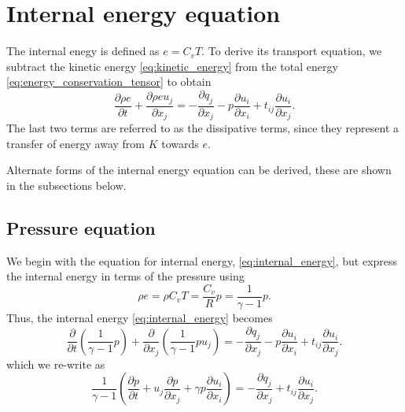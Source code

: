 \documentclass[oneside,a4paper,11pt]{report}
\begin{document}
\section{Internal energy equation}
\label{sec:alternate_forms_internal_energy_equation}
The internal enegy is defined as $e = C_v T$. To derive its transport equation, we subtract the kinetic energy \cref{eq:kinetic_energy} from the total energy \cref{eq:energy_conservation_tensor} to obtain
\begin{equation}
\label{eq:internal_energy}
\frac{ \partial \rho e}{\partial t} + \frac{\partial \rho e u_j}{\partial x_j} = -\frac{\partial q_j}{\partial x_j} - p \frac{\partial u_i}{\partial x_i} + t_{ij} \frac{\partial u_i}{\partial x_j}.
\end{equation}
The last two terms are referred to as the dissipative terms, since they represent a transfer of energy away from $K$ towards $e$.

Alternate forms of the internal energy equation can be derived, these are shown in the subsections below.
\subsection{Pressure equation} 
We begin with the equation for internal energy, \cref{eq:internal_energy}, but express the internal energy in terms of the pressure using 
\begin{equation}
\rho e = \rho C_v T = \frac{C_v}{R} p = \frac{1}{\gamma - 1} p.
\end{equation}
Thus, the internal energy \cref{eq:internal_energy} becomes
\begin{equation}
\frac{ \partial}{\partial t} \left ( \frac{1}{\gamma - 1} p \right ) + \frac{\partial}{\partial x_j} \left ( \frac{1}{\gamma - 1} p u_j \right ) = -\frac{\partial q_j}{\partial x_j} - p \frac{\partial u_i}{\partial x_i} + t_{ij} \frac{\partial u_i}{\partial x_j}.
\end{equation}
which we re-write as
\begin{equation}
\label{eq:energy_form_pressure}
\frac{1}{\gamma - 1} \left ( \frac{ \partial p}{\partial t}  + u_j\frac{\partial p}{\partial x_j} + \gamma p \frac{\partial u_i}{\partial x_i} \right ) = -\frac{\partial q_j}{\partial x_j} + t_{ij} \frac{\partial u_i}{\partial x_j}.
\end{equation}
\end{document}
